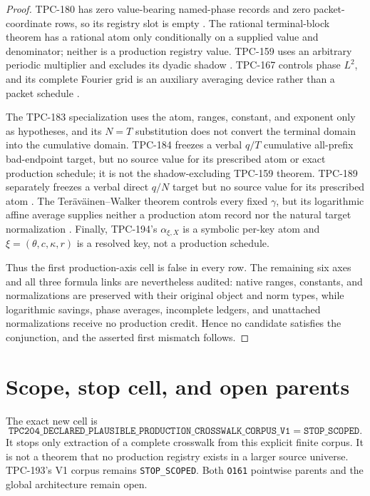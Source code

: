 \documentclass[11pt]{article}
\begin{document}
\begin{proof}
TPC-180 has zero value-bearing named-phase records and zero packet-coordinate
rows, so its registry slot is empty \citep{WangTPC180}.  The rational
terminal-block theorem has a rational atom only conditionally on a supplied
value and denominator; neither is a production registry value.  TPC-159 uses
an arbitrary periodic multiplier and excludes its dyadic shadow
\citep{WangTPC159}.  TPC-167 controls phase \(L^2\), and its complete Fourier
grid is an auxiliary averaging device rather than a packet schedule
\citep{WangTPC167}.

The TPC-183 specialization uses the atom, ranges, constant, and exponent only
as hypotheses, and its \(N=T\) substitution does not convert the terminal
domain into the cumulative domain.  TPC-184 freezes a verbal \(q/T\)
cumulative all-prefix bad-endpoint target, but no source value for its
prescribed atom or exact production schedule; it is not the shadow-excluding
TPC-159 theorem.  TPC-189 separately freezes a verbal direct \(q/N\) target
but no source value for its prescribed atom
\citep{WangTPC183,WangTPC184,WangTPC189}.  The
Ter\"av\"ainen--Walker theorem controls every fixed \(\gamma\), but its
logarithmic affine average supplies neither a production atom record nor the
natural target normalization \citep{TeravainenWalker2025,WangTPC193}.  Finally,
TPC-194's \(\alpha_{\xi,X}\) is a symbolic per-key atom and
\(\xi=(\theta,c,\kappa,r)\) is a resolved key, not a production schedule.

Thus the first production-axis cell is false in every row.  The remaining
six axes and all three formula links are nevertheless audited: native ranges,
constants, and normalizations are preserved with their original object and
norm types, while logarithmic savings, phase averages, incomplete ledgers,
and unattached normalizations receive no production credit.  Hence no
candidate satisfies the conjunction, and the asserted first mismatch follows.
\end{proof}

\section{Scope, stop cell, and open parents}

The exact new cell is
\[
\texttt{TPC204\_DECLARED\_PLAUSIBLE\_PRODUCTION\_CROSSWALK\_CORPUS\_V1}
=\texttt{STOP\_SCOPED}.
\]
It stops only extraction of a complete crosswalk from this explicit finite
corpus.  It is not a theorem that no production registry exists in a larger
source universe.  TPC-193's V1 corpus remains \texttt{STOP\_SCOPED}.  Both
\texttt{O161} pointwise parents and the global architecture remain open.
\end{document}
